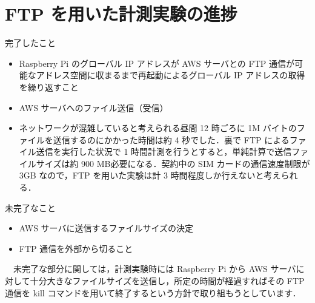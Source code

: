 \documentclass[a4j]{jarticle}
\begin{document}
\section{FTP を用いた計測実験の進捗}
完了したこと
\begin{itemize}
\item Raspberry Pi のグローバル IP アドレスが AWS サーバとの FTP 通信が可能なアドレス空間に収まるまで再起動によるグローバル IP アドレスの取得を繰り返すこと
\item AWS サーバへのファイル送信（受信）
\item ネットワークが混雑していると考えられる昼間 12 時ごろに 1M バイトのファイルを送信するのにかかった時間は約 4 秒でした．裏で FTP によるファイル送信を実行した状況で 1 時間計測を行うとすると，単純計算で送信ファイルサイズは約 900 MB必要になる．契約中の SIM カードの通信速度制限が 3GB なので，FTP を用いた実験は計 3 時間程度しか行えないと考えられる． 
\end{itemize}
未完了なこと
\begin{itemize}
\item AWS サーバに送信するファイルサイズの決定
\item FTP 通信を外部から切ること\\
\end{itemize}
　未完了な部分に関しては，計測実験時には Raspberry Pi から AWS サーバに対して十分大きなファイルサイズを送信し，所定の時間が経過すればその FTP 通信を kill コマンドを用いて終了するという方針で取り組もうとしています．
\end{document}
